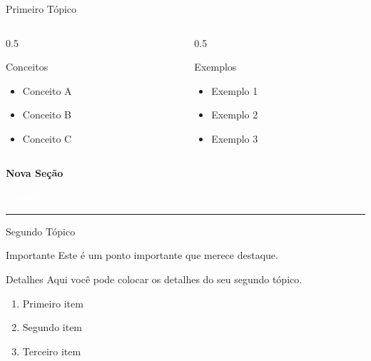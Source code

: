 \documentclass[aspectratio=169]{beamer}
\begin{document}
\begin{frame}{Primeiro Tópico}
    \begin{columns}
        \begin{column}{0.5\textwidth}
            \begin{block}{Conceitos}
                \begin{itemize}
                    \item Conceito A
                    \item Conceito B
                    \item Conceito C
                \end{itemize}
            \end{block}
        \end{column}
        \begin{column}{0.5\textwidth}
            \begin{exampleblock}{Exemplos}
                \begin{itemize}
                    \item Exemplo 1
                    \item Exemplo 2
                    \item Exemplo 3
                \end{itemize}
            \end{exampleblock}
        \end{column}
    \end{columns}
\end{frame}

\layoutsecao

\begin{frame}
    \begin{center}
        \Huge{\textcolor{newtanorange}{\textbf{Nova Seção}}}
        \vspace{1cm}
        
        \Large{\textcolor{white}{Segunda Parte}}
        
        \vspace{2cm}
        \textcolor{white}{\rule{10cm}{2pt}}
    \end{center}
\end{frame}

\layoutpadrao
{}

\begin{frame}{Segundo Tópico}
    \begin{alertblock}{Importante}
        Este é um ponto importante que merece destaque.
    \end{alertblock}
    
    \begin{block}{Detalhes}
        Aqui você pode colocar os detalhes do seu segundo tópico.
        \begin{enumerate}
            \item Primeiro item
            \item Segundo item
            \item Terceiro item
        \end{enumerate}
    \end{block}
\end{frame}
\end{document}
